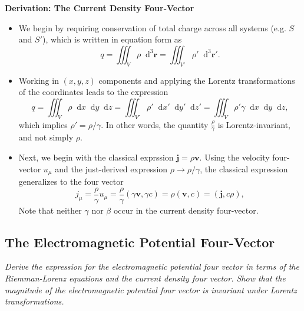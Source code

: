 \documentclass[11pt, a4paper]{article}
\newcommand{\diff}{\mathop{}\!\mathrm{d}} %
\newcommand{\dr}{\diff^{3} \r}  %
\renewcommand{\vec}[1]{\bm{#1}} %
\renewcommand{\r}{\vec{r}}
\renewcommand{\j}{\vec{j}}  %
\begin{document}
\textbf{Derivation: The Current Density Four-Vector}
\begin{itemize}
    \item We begin by requiring conservation of total charge across all systems (e.g. $ S $ and $ S' $), which is written in equation form as
    \begin{equation*}
        q = \iiint_{V} \rho \dr = \iiint_{V'} \rho' \dr'.
    \end{equation*}
    
    \item Working in $ (x, y, z) $ components and applying the Lorentz transformations of the coordinates leads to the expression
    \begin{equation*}
        q = \iiint_{V}\rho \diff x \diff y \diff z = \iiint_{V'}\rho' \diff x' \diff y' \diff z' = \iiint_{V}\rho' \gamma \diff x \diff y \diff z,
    \end{equation*}
    which implies $ \rho' = \rho/\gamma $. In other words, the quantity $ \frac{\rho}{\gamma} $ is Lorentz-invariant, and not simply $ \rho $.
    
	\item Next, we begin with the classical exprssion $ \j = \rho \vec{v} $. Using the velocity four-vector $ u_{\mu} $ and the just-derived expression $ \rho \to \rho/\gamma $, the classical expression generalizes to the four vector
	\begin{equation*}
		j_{\mu} = \frac{\rho}{\gamma} u_{\mu} = \frac{\rho}{\gamma}\left(\gamma \vec{v}, \gamma c\right) = \rho(\vec{v}, c) = (\j, c\rho),
	\end{equation*}
    Note that neither $ \gamma $ nor $ \beta $ occur in the current density four-vector.
	
	
\end{itemize}
    

\subsection{The Electromagnetic Potential Four-Vector}
\textit{Derive the expression for the electromagnetic potential four vector in terms of the Riemman-Lorenz equations and the current density four vector. Show that the magnitude of the electromagnetic potential four vector is invariant under Lorentz transformations.}
\end{document}

